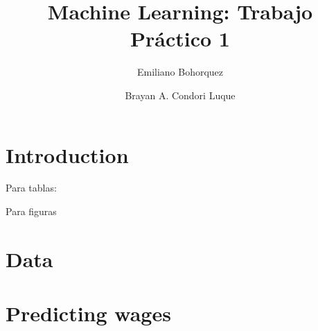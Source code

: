 \documentclass[11pt,oneside]{article}
\begin{document}
	
	
	\title{Machine Learning: Trabajo Práctico 1}
	\author{
		Emiliano Bohorquez \and 
		Brayan A. Condori Luque}
	
	\maketitle
	
	\section{Introduction}

Para tablas:


Para figuras

	\section{Data}
	
	
	
	\section{Predicting wages}
	
	

	
	
	
	
	\newpage
	
	
	
	
\end{document}
